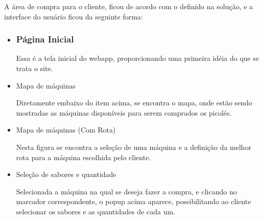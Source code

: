A área de compra para o cliente, ficou de acordo com o definido na solução, e a interface do usuário ficou da seguinte forma:

\begin{itemize}
\item

\subsubsection{Página Inicial}


Essa é a tela inicial do webapp, proporcionando uma primeira idéia do que se trata o site.

\item{Mapa de máquinas}


Diretamente embaixo do item acima, se encontra o mapa, onde estão sendo mostradas as máquinas disponíveis para serem comprados os picolés.

\item{Mapa de máquinas (Com Rota)}


Nesta figura se encontra a seleção de uma máquina e a definição da melhor rota para a máquina escolhida pelo cliente.


\item{Seleção de sabores e quantidade}


Selecionada a máquina na qual se deseja fazer a compra, e clicando no marcador correspondente, o popup acima aparece, possibilitando ao cliente selecionar os sabores e as quantidades de cada um.



\end{itemize}
